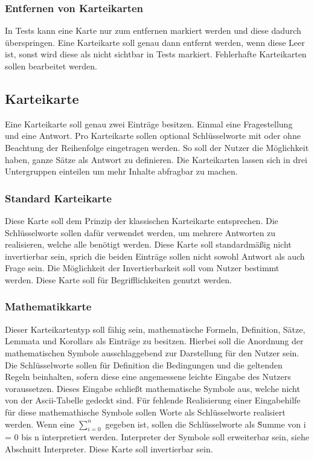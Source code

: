 \documentclass[
a4paper,
twoside,
DIV=12,
BCOR=8mm,
headlineinclude=true,
footinclude=false,
numbers=noenddot,
headheight=40pt, 11pt]{scrartcl}
\begin{document}
\subsubsection{Entfernen von Karteikarten}
In Tests kann eine Karte nur zum entfernen markiert werden und diese dadurch überspringen. Eine Karteikarte soll genau dann entfernt werden, wenn diese Leer ist, sonst wird diese als nicht sichtbar in Tests markiert. Fehlerhafte Karteikarten sollen bearbeitet werden. 
\subsection{Karteikarte}
Eine Karteikarte soll genau zwei Einträge besitzen. Einmal eine Fragestellung und eine Antwort. Pro Karteikarte sollen optional Schlüsselworte mit oder ohne Beachtung der Reihenfolge eingetragen werden. So soll der Nutzer die Möglichkeit haben, ganze Sätze als Antwort zu definieren. Die Karteikarten lassen sich in drei Untergruppen einteilen um mehr Inhalte abfragbar zu machen.
\subsubsection{Standard Karteikarte}
Diese Karte soll dem Prinzip der klassischen Karteikarte entsprechen. Die Schlüsselworte sollen dafür verwendet werden, um mehrere Antworten zu realisieren, welche alle benötigt werden. Diese Karte soll standardmäßig nicht invertierbar sein, sprich die beiden Einträge sollen nicht sowohl Antwort als auch Frage sein. Die Möglichkeit der Invertierbarkeit soll vom Nutzer bestimmt werden. Diese Karte soll für Begrifflichkeiten genutzt werden.
\subsubsection{Mathematikkarte}
Dieser Karteikartentyp soll fähig sein, mathematische Formeln, Definition, Sätze, Lemmata und Korollars als Einträge zu besitzen. Hierbei soll die Anordnung der mathematischen Symbole ausschlaggebend zur Darstellung für den Nutzer sein. Die Schlüsselworte sollen für Definition die Bedingungen und die geltenden Regeln beinhalten, sofern diese eine angemessene leichte Eingabe des Nutzers voraussetzen. Dieses Eingabe schließt mathematische Symbole aus, welche nicht von der Ascii-Tabelle gedeckt sind. Für fehlende Realisierung einer Eingabehilfe für diese mathemathische Symbole sollen Worte als Schlüsselworte realisiert werden. Wenn eine $\sum_{i = 0}^{n}$ gegeben ist, sollen die Schlüsselworte als \" Summe von i = 0 bis n \" interpretiert werden. Interpreter der Symbole soll erweiterbar sein, siehe Abschnitt Interpreter. Diese Karte soll invertierbar sein.
\end{document}
